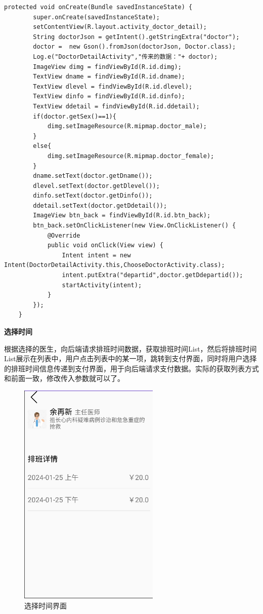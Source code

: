 \documentclass[UTF8,12pt]{article}
\begin{document}
\begin{lstlisting}[frame=shadowbox]
    protected void onCreate(Bundle savedInstanceState) {
        super.onCreate(savedInstanceState);
        setContentView(R.layout.activity_doctor_detail);
        String doctorJson = getIntent().getStringExtra("doctor");
        doctor =  new Gson().fromJson(doctorJson, Doctor.class);
        Log.e("DoctorDetailActivity","传来的数据："+ doctor);
        ImageView dimg = findViewById(R.id.dimg);
        TextView dname = findViewById(R.id.dname);
        TextView dlevel = findViewById(R.id.dlevel);
        TextView dinfo = findViewById(R.id.dinfo);
        TextView ddetail = findViewById(R.id.ddetail);
        if(doctor.getSex()==1){
            dimg.setImageResource(R.mipmap.doctor_male);
        }
        else{
            dimg.setImageResource(R.mipmap.doctor_female);
        }
        dname.setText(doctor.getDname());
        dlevel.setText(doctor.getDlevel());
        dinfo.setText(doctor.getDinfo());
        ddetail.setText(doctor.getDdetail());
        ImageView btn_back = findViewById(R.id.btn_back);
        btn_back.setOnClickListener(new View.OnClickListener() {
            @Override
            public void onClick(View view) {
                Intent intent = new Intent(DoctorDetailActivity.this,ChooseDoctorActivity.class);
                intent.putExtra("departid",doctor.getDdepartid());
                startActivity(intent);
            }
        });
    }
\end{lstlisting}

\newpage

\textbf{选择时间}

根据选择的医生，向后端请求排班时间数据，获取排班时间List，然后将排班时间List展示在列表中，用户点击列表中的某一项，跳转到支付界面，同时将用户选择的排班时间信息传递到支付界面，用于向后端请求支付数据。实际的获取列表方式和前面一致，修改传入参数就可以了。

\begin{figure}[htbp]
    \centering
    \includegraphics[width=0.6\textwidth]{imgs/24.png}
    \caption{选择时间界面}
\end{figure}
\end{document}
